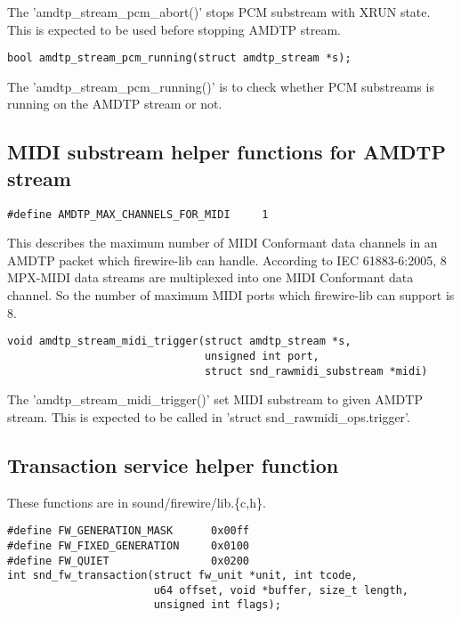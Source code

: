 \documentclass[onecolumn]{article}
\begin{document}
The 'amdtp\_stream\_pcm\_abort()' stops PCM substream with XRUN state. This is expected to be used before stopping AMDTP stream.

\begin{verbatim}
bool amdtp_stream_pcm_running(struct amdtp_stream *s);
\end{verbatim}

The 'amdtp\_stream\_pcm\_running()' is to check whether PCM substreams is running on the AMDTP stream or not.


\subsection{MIDI substream helper functions for AMDTP stream}

\begin{verbatim}
#define AMDTP_MAX_CHANNELS_FOR_MIDI     1
\end{verbatim}

This describes the maximum number of MIDI Conformant data channels in an AMDTP packet which firewire-lib can handle. According to IEC 61883-6:2005, 8 MPX-MIDI data streams are multiplexed into one MIDI Conformant data channel. So the number of maximum MIDI ports which firewire-lib can support is 8.

\begin{verbatim}
void amdtp_stream_midi_trigger(struct amdtp_stream *s,
                               unsigned int port,
                               struct snd_rawmidi_substream *midi)
\end{verbatim}

The 'amdtp\_stream\_midi\_trigger()' set MIDI substream to given AMDTP stream. This is expected to be called in 'struct snd\_rawmidi\_ops.trigger'.


\subsection{Transaction service helper function}

These functions are in sound/firewire/lib.\{c,h\}.

\begin{verbatim}
#define FW_GENERATION_MASK      0x00ff
#define FW_FIXED_GENERATION     0x0100
#define FW_QUIET                0x0200
int snd_fw_transaction(struct fw_unit *unit, int tcode,
                       u64 offset, void *buffer, size_t length,
                       unsigned int flags);
\end{verbatim}
\end{document}
